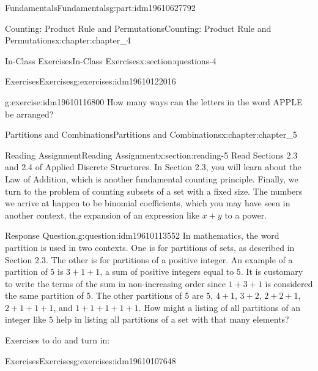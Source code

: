 \documentclass[oneside,10pt,]{book}
\numberwithin{equation}{section}
\begin{document}
\begin{partptx}{Fundamentals}{}{Fundamentals}{}{}{g:part:idm19610627792}
\begin{chapterptx}{Counting: Product Rule and Permutations}{}{Counting: Product Rule and Permutations}{}{}{x:chapter:chapter_4}
\begin{sectionptx}{In-Class Exercises}{}{In-Class Exercises}{}{}{x:section:questions-4}
\begin{exercises-subsection-numberless}{Exercises}{}{Exercises}{}{}{g:exercises:idm19610122016}
\begin{exercisegroup}
\begin{divisionexerciseeg}{4}{}{}{g:exercise:idm19610116800}
How many ways can the letters in the word APPLE be arranged?%
\end{divisionexerciseeg}%
\end{exercisegroup}
\par\medskip\noindent
\end{exercises-subsection-numberless}
\end{sectionptx}
\end{chapterptx}
%
\typeout{************************************************}
\typeout{************************************************}
%
\begin{chapterptx}{Partitions and Combinations}{}{Partitions and Combinations}{}{}{x:chapter:chapter_5}
%
%
%
\typeout{************************************************}
\typeout{************************************************}
%
\begin{sectionptx}{Reading Assignment}{}{Reading Assignment}{}{}{x:section:reading-5}
Read Sections 2.3 and 2.4 of Applied Discrete Structures. In Section 2.3, you will learn about the Law of Addition, which is another fundamental counting principle.  Finally, we turn to the problem of counting subsets of a set with a fixed size.  The numbers we arrive at happen to be binomial coefficients, which you may have seen in another context, the expansion of an expression like \(x + y\) to a power.%
\begin{question}{Response Question.}{g:question:idm19610113552}%
In mathematics, the word partition is used in two contexts. One is for partitions of sets, as described in Section 2.3. The other is for partitions of a positive integer.  An example of a partition of \(5\) is \(3+1+1\), a sum of positive integers equal to \(5\). It is customary to write the terms of the sum in non-increasing order since \(1+3+1\) is considered the same partition of \(5\). The other partitions of 5 are \(5\), \(4+1\), \(3+2\), \(2+2+1\), \(2+1+1+1\), and \(1+1+1+1+1\). How might a listing of all partitions of an integer like \(5\) help in listing all partitions of a set with that many elements?%
\end{question}
Exercises to do and turn in:%
%
%
\typeout{************************************************}
\typeout{************************************************}
%
\begin{exercises-subsection-numberless}{Exercises}{}{Exercises}{}{}{g:exercises:idm19610107648}
\par\medskip\noindent%

\end{exercises-subsection-numberless}
\end{sectionptx}
\end{chapterptx}
\end{partptx}
\end{document}
